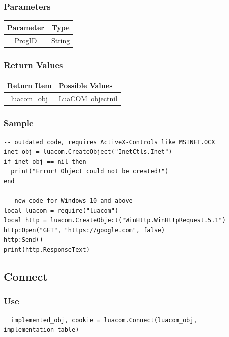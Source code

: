 \documentclass[11pt,a4paper,english]{report}
\newcommand{\techname}[1]{\mbox{#1}}
\newcommand{\luacom}{\techname{LuaCOM}}
\begin{document}
\subsubsection*{Parameters}

\begin{tabular}{|c|c|}
\hline
\bf Parameter & \bf Type  \\ \hline \hline
ProgID & String \\ \hline
\end{tabular}

\subsubsection*{Return Values}

\begin{tabular}{|c|p{4cm}|}
\hline
\bf Return Item & \bf Possible Values \\ \hline \hline
luacom\_obj  & \luacom\ object\newline nil \\ \hline
\end{tabular}

\subsubsection*{Sample}

\begin{verbatim}
-- outdated code, requires ActiveX-Controls like MSINET.OCX
inet_obj = luacom.CreateObject("InetCtls.Inet")
if inet_obj == nil then
  print("Error! Object could not be created!")
end

-- new code for Windows 10 and above
local luacom = require("luacom")
local http = luacom.CreateObject("WinHttp.WinHttpRequest.5.1")
http:Open("GET", "https://google.com", false)
http:Send()
print(http.ResponseText)
\end{verbatim}




\subsection*{Connect}
\subsubsection*{Use}

  \begin{verbatim}
  implemented_obj, cookie = luacom.Connect(luacom_obj, implementation_table)
  \end{verbatim}
\end{document}

